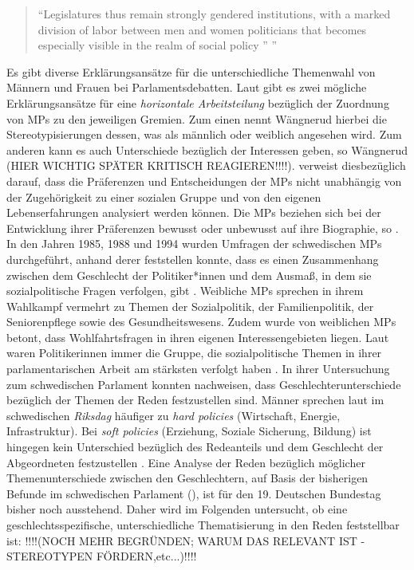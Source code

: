\documentclass[12pt, 
    twoside=false, 
    bibliography=totoc, 
    numbers=endperiod, 
    headings=normal, 
    toc=chapterentrydotfill
    ]{scrbook}
\begin{document}
\begin{quote}
    \enquote{Legislatures thus remain strongly gendered institutions, with a marked division of labor between men and women politicians that becomes especially visible in the realm of social policy ” \parencite[250]{ennser-jedenastik_2017}}
\end{quote}

Es gibt diverse Erklärungsansätze für die unterschiedliche Themenwahl von Männern und Frauen bei Parlamentsdebatten. Laut \textcite{wangnerud_1996}  gibt es zwei mögliche Erklärungsansätze für eine \emph{horizontale Arbeitsteilung} bezüglich der Zuordnung von MPs zu den jeweiligen Gremien. Zum einen nennt Wängnerud hierbei die Stereotypisierungen dessen, was als männlich oder weiblich angesehen wird. Zum anderen kann es auch Unterschiede bezüglich der Interessen geben, so Wängnerud (HIER WICHTIG SPÄTER KRITISCH REAGIEREN!!!!). \textcite{back_2014} verweist diesbezüglich darauf, dass die Präferenzen und Entscheidungen der MPs nicht unabhängig von der Zugehörigkeit zu einer sozialen Gruppe und von den eigenen Lebenserfahrungen analysiert werden können. Die MPs beziehen sich bei der Entwicklung ihrer Präferenzen bewusst oder unbewusst auf ihre Biographie, so  \textcite[507]{back_2014}. 
In den Jahren 1985, 1988 und 1994 wurden Umfragen der schwedischen MPs durchgeführt, anhand derer \textcite[81]{wangnerud_2000} feststellen konnte, dass es einen Zusammenhang zwischen dem Geschlecht der Politiker*innen und dem Ausmaß, in dem sie sozialpolitische Fragen verfolgen, gibt \parencites[506]{back_2014}[82]{wangnerud_2000}. Weibliche MPs sprechen in ihrem Wahlkampf vermehrt zu Themen der Sozialpolitik, der Familienpolitik, der Seniorenpflege sowie des Gesundheitswesens. Zudem wurde von weiblichen MPs betont, dass Wohlfahrtsfragen in ihren eigenen Interessengebieten liegen. Laut \textcite[82]{wangnerud_2000} waren Politikerinnen immer die Gruppe, die sozialpolitische Themen in ihrer parlamentarischen Arbeit am stärksten verfolgt haben \parencites[vgl.][507]{back_2014}.
In ihrer Untersuchung zum schwedischen Parlament konnten \textcite{back_2014} nachweisen, dass Geschlechterunterschiede bezüglich der Themen der Reden festzustellen sind. Männer sprechen laut \textcite{back_2014} im schwedischen \emph{Riksdag} häufiger zu \emph{hard policies} (Wirtschaft, Energie, Infrastruktur). Bei \emph{soft policies} (Erziehung, Soziale Sicherung, Bildung) ist hingegen kein Unterschied bezüglich des Redeanteils und dem Geschlecht der Abgeordneten festzustellen \parencite[514f.]{back_2014}. Eine Analyse der Reden bezüglich möglicher Themenunterschiede zwischen den Geschlechtern, auf Basis der bisherigen Befunde im schwedischen Parlament (\parencites{wangnerud_2000}{wangnerud_2009}{back_2014}), ist für den 19. Deutschen Bundestag bisher noch ausstehend. Daher wird im Folgenden untersucht, ob eine geschlechtsspezifische, unterschiedliche Thematisierung in den Reden feststellbar ist: !!!!(NOCH MEHR BEGRÜNDEN; WARUM DAS RELEVANT IST - STEREOTYPEN FÖRDERN,etc...)!!!!
\end{document}
